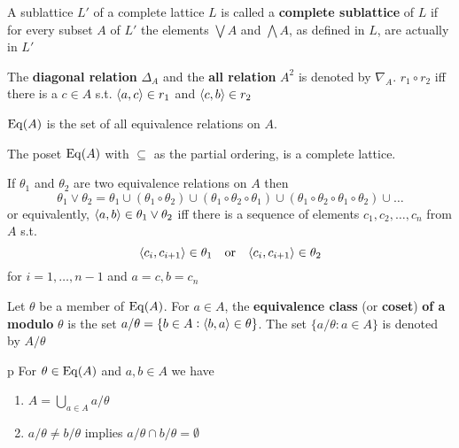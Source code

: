 \documentclass[11pt]{article}
\begin{document}
\begin{definition}[]
A sublattice \(L'\) of a complete lattice \(L\) is called a \textbf{complete sublattice}
of \(L\) if for every subset \(A\) of \(L'\) the elements \(\bigvee A\) and
\(\bigwedge A\), as defined in \(L\), are actually in \(L'\)
\end{definition}

\begin{definition}[]
The \textbf{diagonal relation} \(\Delta_A\) and the \textbf{all relation} \(A^2\) is denoted by 
\(\nabla_A\). \(r_1\circ r_2\) iff there is a \(c\in A\) s.t. 
\(\langle a,c\rangle\in r_1\) and \(\langle c,b\rangle\in r_2\)
\end{definition}


\(\operatorname{Eq}(A)\) is the set of all equivalence relations on \(A\).

\begin{theorem}[]
The poset \(\operatorname{Eq}(A)\) with \(\subseteq\) as the partial ordering, is a
complete lattice.
\end{theorem}

\begin{theorem}[]
If \(\theta_1\) and \(\theta_2\) are two equivalence relations on \(A\) then
\begin{equation*}
\theta_1\vee\theta_2=\theta_1\cup(\theta_1\circ\theta_2)
\cup(\theta_1\circ\theta_2\circ\theta_1)\cup(\theta_1\circ
\theta_2\circ\theta_1\circ\theta_2)\cup\dots
\end{equation*}
or equivalently, \(\langle a,b\rangle\in\theta_1\vee\theta_2\) iff there is a
sequence of elements \(c_1,c_2,\dots,c_n\) from \(A\) s.t.
\begin{equation*}
\langle c_i,c_{i+1}\rangle\in\theta_1\quad\text{or}\quad\langle c_i,c_{i+1}\rangle\in\theta_2
\end{equation*}
for \(i=1,\dots,n-1\) and \(a=c,b=c_n\)
\end{theorem}

\begin{definition}[]
Let \(\theta\) be a member of \(\operatorname{Eq}(A)\). For \(a\in A\), the \textbf{equivalence class} (or
\textbf{coset}) \textbf{of a modulo} \(\theta\) is the set \(a/\theta=\{b\in A:\langle
   b,a\rangle\in\theta\}\). The set \(\{a/\theta:a\in A\}\) is denoted by
\(A/\theta\) 
\end{definition}

\begin{theorem}[]p
For \(\theta\in\operatorname{Eq}(A)\) and \(a,b\in A\) we have
\begin{enumerate}
\item \(A=\bigcup_{a\in A}a/\theta\)
\item \(a/\theta\neq b/\theta\) implies \(a/\theta\cap b/\theta=\emptyset\)
\end{enumerate}
\end{theorem}
\end{document}
